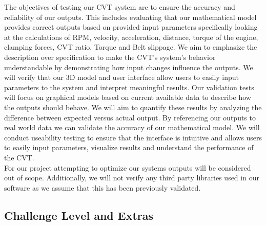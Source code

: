 \documentclass[12pt, titlepage]{article}
\begin{document}


\noindent The objectives of testing our CVT system are to ensure the accuracy and reliability of our outputs. 
This includes evaluating that our mathematical model provides correct outputs based on provided input parameters specifically looking at the calculations of RPM, velocity, acceleration, distance, torque of the engine, clamping forces, CVT ratio, Torque and Belt slippage. 
We aim to emphasize the description over specification to make the CVT's system's behavior understandable by demonstrating how input changes influence the outputs.
We will verify that our 3D model and user interface allow users to easily input parameters to the system and interpret meaningful results. 
Our validation tests will focus on graphical models based on current available data to describe how the outputs should behave. 
We will aim to quantify these results by analyzing the difference between expected versus actual output. 
By referencing our outputs to real world data we can validate the accuracy of our mathematical model.
We will conduct useability testing to ensure that the interface is intuitive and allows users to easily input parameters, visualize results and understand the performance of the CVT.
\\
\noindent For our project attempting to optimize our systems outputs will be considered out of scope. 
Additionally, we will not verify any third party libraries used in our software as we assume that this has been previously validated. 

\subsection{Challenge Level and Extras}
\end{document}
